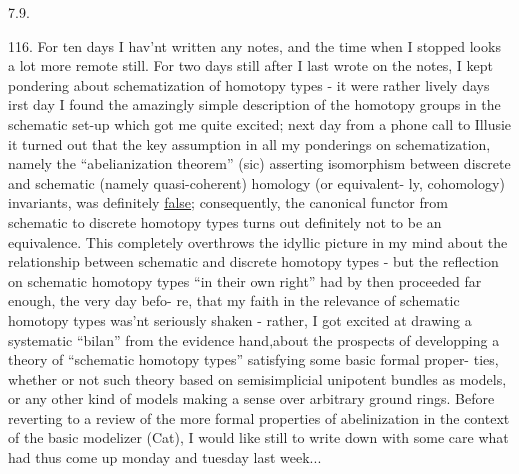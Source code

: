 
7.9.

116.   For ten days I hav'nt written any notes,  and the time when I
stopped looks a lot more remote still.  For two days still after I last
wrote on the notes,  I kept pondering about schematization of homotopy
types  -  it were rather lively days  irst day I found the amazingly
simple description of the homotopy groups in the schematic set-up\hand{,} which
got me quite excited;  next day\hand{,} from a phone call to Illusie\hand{,} it turned
out that the key assumption in all my ponderings on schematization,
namely the ``abelianization theorem'' (sic) asserting isomorphism between
discrete and schematic (namely quasi-coherent) homology (or equivalent-%
ly,  cohomology) invariants,  was definitely \uline{false};  consequently,  the
canonical functor from schematic to discrete homotopy types turns out
definitely not to be an equivalence.  This completely overthrows the
idyllic picture in my mind about the relationship between schematic  and
discrete homotopy types  -  but the reflection on schematic homotopy types
``in their own right'' had by then proceeded far enough, the very day befo-%
re, that my faith in the relevance of schematic homotopy types was'nt
seriously shaken  -  rather,  I got excited at drawing a systematic
``bilan'' from the evidence   hand,about the prospects of developping a
theory of ``schematic homotopy types'' satisfying some basic formal proper-%
ties,  whether or not such theory  based on semisimplicial unipotent
bundles as  models,  or  any other kind of models making a sense
over arbitrary ground rings.  Before reverting to a review of the more
formal properties of abelinization in the context of the basic modelizer
(Cat),  I would like still to write down with some care what had thus
come up monday and tuesday last week...

